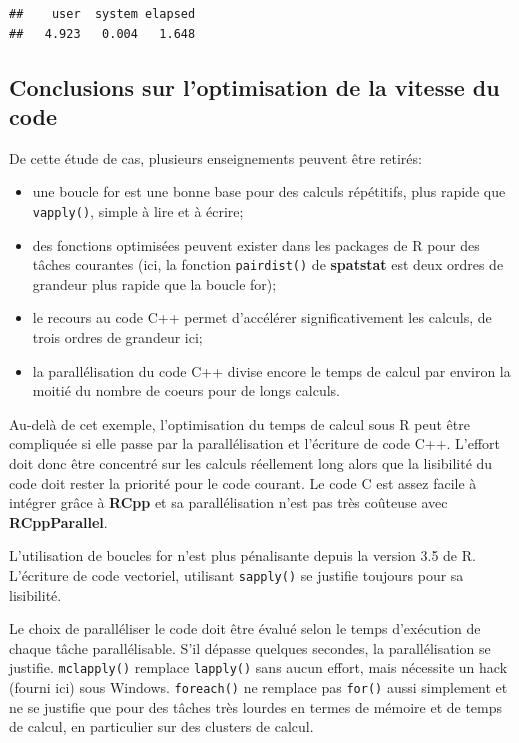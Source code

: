 \documentclass[
  12pt,
  french,
  a4paper,
  extrafontsizes,onecolumn,openright
  ]{memoir}
\providecommand{\tightlist}{%
  \setlength{\itemsep}{0pt}\setlength{\parskip}{0pt}}
\begin{document}
\begin{verbatim}
##    user  system elapsed 
##   4.923   0.004   1.648
\end{verbatim}

\normalsize

\hypertarget{conclusions-sur-loptimisation-de-la-vitesse-du-code}{%
\subsection{Conclusions sur l'optimisation de la vitesse du code}\label{conclusions-sur-loptimisation-de-la-vitesse-du-code}}

De cette étude de cas, plusieurs enseignements peuvent être retirés:

\begin{itemize}
\tightlist
\item
  une boucle for est une bonne base pour des calculs répétitifs, plus rapide que \texttt{vapply()}, simple à lire et à écrire;
\item
  des fonctions optimisées peuvent exister dans les packages de R pour des tâches courantes (ici, la fonction \texttt{pairdist()} de \textbf{spatstat} est deux ordres de grandeur plus rapide que la boucle for);
\item
  le recours au code C++ permet d'accélérer significativement les calculs, de trois ordres de grandeur ici;
\item
  la parallélisation du code C++ divise encore le temps de calcul par environ la moitié du nombre de coeurs pour de longs calculs.
\end{itemize}

Au-delà de cet exemple, l'optimisation du temps de calcul sous R peut être compliquée si elle passe par la parallélisation et l'écriture de code C++.
L'effort doit donc être concentré sur les calculs réellement long alors que la lisibilité du code doit rester la priorité pour le code courant.
Le code C est assez facile à intégrer grâce à \textbf{RCpp} et sa parallélisation n'est pas très coûteuse avec \textbf{RCppParallel}.

L'utilisation de boucles for n'est plus pénalisante depuis la version 3.5 de R.
L'écriture de code vectoriel, utilisant \texttt{sapply()} se justifie toujours pour sa lisibilité.

Le choix de paralléliser le code doit être évalué selon le temps d'exécution de chaque tâche parallélisable.
S'il dépasse quelques secondes, la parallélisation se justifie.
\texttt{mclapply()} remplace \texttt{lapply()} sans aucun effort, mais nécessite un hack (fourni ici) sous Windows.
\texttt{foreach()} ne remplace pas \texttt{for()} aussi simplement et ne se justifie que pour des tâches très lourdes en termes de mémoire et de temps de calcul, en particulier sur des clusters de calcul.
\end{document}
